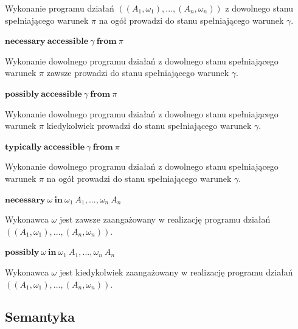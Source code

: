 \documentclass[11pt,a4paper]{article}
\begin{document}
    Wykonanie programu działań $((A_1, \omega_1),...,(A_n, \omega_n))$ z dowolnego stanu spełniającego  warunek $\pi$ na ogół prowadzi do stanu spełniającego warunek $\gamma$.
    
    \begin{center}
        $\mathbf{necessary}~\mathbf{accessible}~\gamma~\mathbf{from}~\pi$
    \end{center}
    
    Wykonanie dowolnego programu działań z dowolnego stanu spełniającego warunek $\pi$ zawsze prowadzi do stanu spełniającego warunek $\gamma$.
    
    \begin{center}
        $\mathbf{possibly}~\mathbf{accessible}~\gamma~\mathbf{from}~\pi$
    \end{center}
    
    Wykonanie dowolnego programu działań z dowolnego stanu spełniającego warunek $\pi$ kiedykolwiek prowadzi do stanu spełniającego warunek $\gamma$.
    
    
    \begin{center}
        $\mathbf{typically}~\mathbf{accessible}~\gamma~\mathbf{from}~\pi$
    \end{center}
    
    Wykonanie dowolnego programu działań z dowolnego stanu spełniającego warunek $\pi$ na ogół prowadzi do stanu spełniającego warunek $\gamma$.
    
    \begin{center}
        $\mathbf{necessary}~\omega~\mathbf{in}~\omega_1~A_1, ..., \omega_n~A_n$
    \end{center}
    
    Wykonawca $\omega$ jest zawsze zaangażowany w realizację programu działań $((A_1, \omega_1),...,(A_n, \omega_n))$.
    
    \begin{center}
        $\mathbf{possibly}~\omega~\mathbf{in}~\omega_1~A_1, ..., \omega_n~A_n$
    \end{center}
    
    Wykonawca $\omega$ jest kiedykolwiek zaangażowany w realizację programu działań $((A_1, \omega_1),...,(A_n, \omega_n))$.    
    
    \subsection{Semantyka}
    
\end{document}
